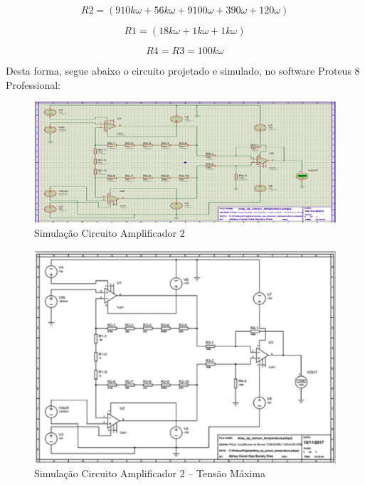 \begin{equation}\label{eq1tc}
    R2 = (910k\omega + 56k\omega + 9100\omega + 390\omega + 120\omega)
\end{equation}

\begin{equation}\label{eq1tc}
    R1 = (18k\omega + 1k\omega + 1k\omega)
\end{equation}

\begin{equation}\label{eq1tc}
    R4 = R3 = 100k\omega
\end{equation}

Desta forma, segue abaixo o circuito projetado e simulado, no software Proteus 8 Professional:

\begin{figure}[!htb]                  
	\centering                          
	\includegraphics[scale=0.6]{figuras/circ1.eps}
	\caption{ Simulação Circuito Amplificador 2 }             
\end{figure}

\begin{figure}[!htb]                  
	\centering                          
	\includegraphics[scale=0.5]{figuras/circ2.eps}
	\caption{ Simulação Circuito Amplificador 2 – Tensão Máxima }             
\end{figure}

